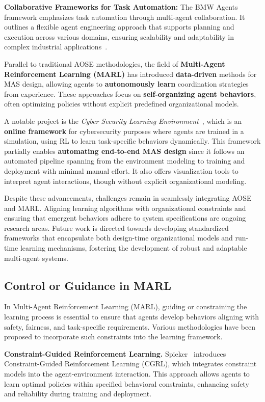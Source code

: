 \documentclass[pdflatex,sn-mathphys-num]{sn-jnl}%
\theoremstyle{thmstyleone}%
\theoremstyle{thmstyletwo}%
\theoremstyle{thmstylethree}%
\begin{document}
\textbf{Collaborative Frameworks for Task Automation:} The BMW Agents framework emphasizes task automation through multi-agent collaboration. It outlines a flexible agent engineering approach that supports planning and execution across various domains, ensuring scalability and adaptability in complex industrial applications~\cite{crawford2024bmw}.

Parallel to traditional AOSE methodologies, the field of \textbf{Multi-Agent Reinforcement Learning (MARL)} has introduced \textbf{data-driven} methods for MAS design, allowing agents to \textbf{autonomously learn} coordination strategies from experience. These approaches focus on \textbf{self-organizing agent behaviors}, often optimizing policies without explicit predefined organizational models.

A notable project is the \textit{Cyber Security Learning Environment}~\cite{hammar2023scalable}, which is an \textbf{online framework} for cybersecurity purposes where agents are trained in a simulation, using RL to learn task-specific behaviors dynamically. This framework partially enables \textbf{automating end-to-end MAS design} since it follows an automated pipeline spanning from the environment modeling to training and deployment with minimal manual effort. It also offers visualization tools to interpret agent interactions, though without explicit organizational modeling.

Despite these advancements, challenges remain in seamlessly integrating AOSE and MARL. Aligning learning algorithms with organizational constraints and ensuring that emergent behaviors adhere to system specifications are ongoing research areas. Future work is directed towards developing standardized frameworks that encapsulate both design-time organizational models and run-time learning mechanisms, fostering the development of robust and adaptable multi-agent systems.


\subsection{Control or Guidance in MARL}\label{sub-sec:rel_control}

In Multi-Agent Reinforcement Learning (MARL), guiding or constraining the learning process is essential to ensure that agents develop behaviors aligning with safety, fairness, and task-specific requirements. Various methodologies have been proposed to incorporate such constraints into the learning framework.

\textbf{Constraint-Guided Reinforcement Learning.} Spieker~\cite{spieker2021constraint} introduces Constraint-Guided Reinforcement Learning (CGRL), which integrates constraint models into the agent-environment interaction. This approach allows agents to learn optimal policies within specified behavioral constraints, enhancing safety and reliability during training and deployment.
\end{document}
